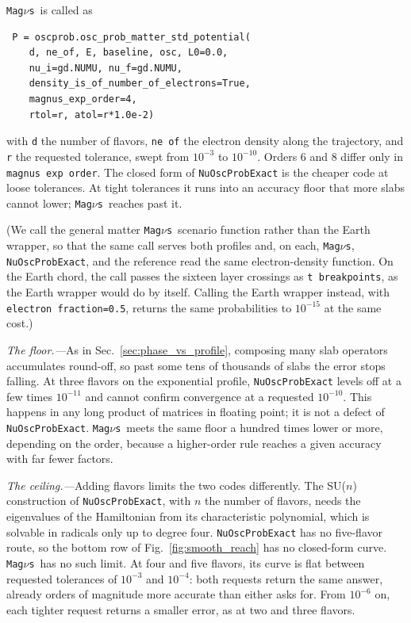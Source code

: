 \documentclass[final,5p,times,twocolumn,sort,compress]{elsarticle}
\makeatletter
\newcommand{\fig}{Fig.}
\DeclareRobustCommand{\_}{%
  \ifmmode\nfss@text{\textunderscore}\else\textunderscore\allowbreak\fi}
\newcommand{\figu}[1]{\fig~\ref{fig:#1}}
\newcommand{\magnus}{{\tt Mag}\ensuremath{\nu}{\tt s}}
\makeatother
\begin{document}
\magnus\ is called as
\begin{verbatim}
 P = oscprob.osc_prob_matter_std_potential(
    d, ne_of, E, baseline, osc, L0=0.0,
    nu_i=gd.NUMU, nu_f=gd.NUMU,
    density_is_of_number_of_electrons=True,
    magnus_exp_order=4,
    rtol=r, atol=r*1.0e-2)
\end{verbatim}
with {\tt d} the number of flavors, {\tt ne\_of} the electron density along the trajectory, and {\tt r} the requested tolerance, swept from $10^{-3}$ to $10^{-10}$. Orders 6 and 8 differ only in {\tt magnus\_exp\_order}. The closed form of {\tt NuOscProbExact} is the cheaper code at loose tolerances. At tight tolerances it runs into an accuracy floor that more slabs cannot lower; \magnus\ reaches past it.

(We call the general matter \magnus\ scenario function rather than the Earth wrapper, so that the same call serves both profiles and, on each, \magnus, {\tt NuOscProbExact}, and the reference read the same electron-density function. On the Earth chord, the call passes the sixteen layer crossings as {\tt t\_breakpoints}, as the Earth wrapper would do by itself. Calling the Earth wrapper instead, with {\tt electron\_fraction=0.5}, returns the same probabilities to $10^{-15}$ at the same cost.)

\smallskip

\textit{The floor.---}As in Sec.~\ref{sec:phase_vs_profile}, composing many slab operators accumulates round-off, so past some tens of thousands of slabs the error stops falling. At three flavors on the exponential profile, {\tt NuOscProbExact} levels off at a few times $10^{-11}$ and cannot confirm convergence at a requested $10^{-10}$. This happens in any long product of matrices in floating point; it is not a defect of {\tt NuOscProbExact}. \magnus\ meets the same floor a hundred times lower or more, depending on the order, because a higher-order rule reaches a given accuracy with far fewer factors.

\smallskip

\textit{The ceiling.---}Adding flavors limits the two codes differently. The SU($n$) construction of {\tt NuOscProbExact}, with $n$ the number of flavors, needs the eigenvalues of the Hamiltonian from its characteristic polynomial, which is solvable in radicals only up to degree four. {\tt NuOscProbExact} has no five-flavor route, so the bottom row of \figu{smooth_reach} has no closed-form curve. \magnus\ has no such limit. At four and five flavors, its curve is flat between requested tolerances of $10^{-3}$ and $10^{-4}$: both requests return the same answer, already orders of magnitude more accurate than either asks for. From $10^{-6}$ on, each tighter request returns a smaller error, as at two and three flavors.
\end{document}
